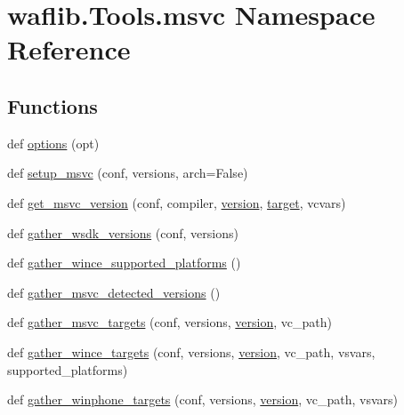 \hypertarget{namespacewaflib_1_1_tools_1_1msvc}{}\section{waflib.\+Tools.\+msvc Namespace Reference}
\label{namespacewaflib_1_1_tools_1_1msvc}
\subsection*{Functions}
\begin{DoxyCompactItemize}
\item 
def \hyperlink{namespacewaflib_1_1_tools_1_1msvc_a2c0fdbc609fbe0cb5a325b101835a489}{options} (opt)
\item 
def \hyperlink{namespacewaflib_1_1_tools_1_1msvc_afba1206992858f99b00e632f2e0c2c1d}{setup\+\_\+msvc} (conf, versions, arch=False)
\item 
def \hyperlink{namespacewaflib_1_1_tools_1_1msvc_a6f31284847049b4f0be838fc7fd06786}{get\+\_\+msvc\+\_\+version} (conf, compiler, \hyperlink{lib_2expat_8h_aec5db107b91447a96c47961ce9df2660}{version}, \hyperlink{lib_2expat_8h_a15a257516a87decb971420e718853137}{target}, vcvars)
\item 
def \hyperlink{namespacewaflib_1_1_tools_1_1msvc_a3d32a702d53caab847ca6e867019a30c}{gather\+\_\+wsdk\+\_\+versions} (conf, versions)
\item 
def \hyperlink{namespacewaflib_1_1_tools_1_1msvc_a28005f4305bcbdb7a1a59d22b185c2ce}{gather\+\_\+wince\+\_\+supported\+\_\+platforms} ()
\item 
def \hyperlink{namespacewaflib_1_1_tools_1_1msvc_aff791d3a81321fa3dab5f4a07b931619}{gather\+\_\+msvc\+\_\+detected\+\_\+versions} ()
\item 
def \hyperlink{namespacewaflib_1_1_tools_1_1msvc_af9be199299cf9f16cca30ae8b169d4d5}{gather\+\_\+msvc\+\_\+targets} (conf, versions, \hyperlink{lib_2expat_8h_aec5db107b91447a96c47961ce9df2660}{version}, vc\+\_\+path)
\item 
def \hyperlink{namespacewaflib_1_1_tools_1_1msvc_a8fa5731e2eceb49992ad6e3a0f0d0e51}{gather\+\_\+wince\+\_\+targets} (conf, versions, \hyperlink{lib_2expat_8h_aec5db107b91447a96c47961ce9df2660}{version}, vc\+\_\+path, vsvars, supported\+\_\+platforms)
\item 
def \hyperlink{namespacewaflib_1_1_tools_1_1msvc_a6a24a12a1b399800a1f44756e45f5f9e}{gather\+\_\+winphone\+\_\+targets} (conf, versions, \hyperlink{lib_2expat_8h_aec5db107b91447a96c47961ce9df2660}{version}, vc\+\_\+path, vsvars)

\end{DoxyCompactItemize}
